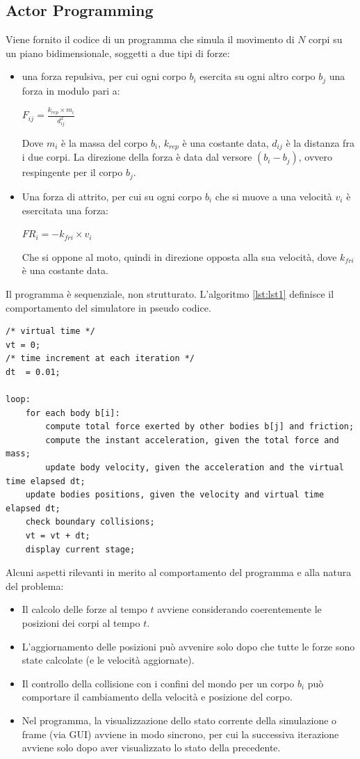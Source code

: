 \documentclass[12pt,a4paper,openright,twoside]{book}
\begin{document}
\subsection{Actor Programming}
Viene fornito il codice di un programma che simula il movimento di $N$ corpi su un piano bidimensionale,
soggetti a due tipi di forze:
\begin{itemize}
	\item una forza repulsiva, per cui ogni corpo $b_{i}$ esercita su ogni altro corpo $b_{j}$ una forza in modulo pari a:
	\begin{center}
		$ F_{ij} = \frac{k_{rep} \times m_{i}}{d^2_{ij}} $
	\end{center}
	Dove $m_{i}$ è la massa del corpo $b_{i}$, $k_{rep}$ è una costante data, $d_{ij}$ è la distanza fra i due corpi.
	La direzione della forza è data dal versore $(b_{i} - b_{j})$, ovvero respingente per il corpo $b_{j}$.
	\item Una forza di attrito, per cui su ogni corpo $b_{i}$ che si muove a una velocità $v_{i}$ è esercitata una forza:
	\begin{center}
		$ FR_{i} = - k_{fri} \times v_{i} $
	\end{center}
	Che si oppone al moto, quindi in direzione opposta alla sua velocità, dove $k_{fri}$ è una costante data.
\end{itemize}
Il programma è sequenziale, non strutturato. 
L'algoritmo \ref{lst:lst1} definisce il comportamento del simulatore in pseudo codice.
\newpage
\begin{lstlisting}[label=lst:lst1,caption=Pseudocodice del programma sequenziale]
/* virtual time */
vt = 0;
/* time increment at each iteration */     
dt  = 0.01;

loop:
	for each body b[i]:
		compute total force exerted by other bodies b[j] and friction;
		compute the instant acceleration, given the total force and mass;
		update body velocity, given the acceleration and the virtual time elapsed dt;
	update bodies positions, given the velocity and virtual time elapsed dt;
	check boundary collisions;
	vt = vt + dt;   
	display current stage;

\end{lstlisting}

Alcuni aspetti rilevanti in merito al comportamento del programma e alla natura del problema:
\begin{itemize}
	\item Il calcolo delle forze al tempo $t$ avviene considerando coerentemente le posizioni dei corpi al tempo $t$. 
	\item L'aggiornamento delle posizioni può avvenire solo dopo che tutte le forze sono state calcolate (e le velocità aggiornate).
	\item Il controllo della collisione con i confini del mondo per un corpo $b_{i}$ può comportare il cambiamento della velocità e posizione del corpo.
	\item Nel programma, la visualizzazione dello stato corrente della simulazione o frame (via GUI) avviene in modo sincrono, per cui la successiva iterazione avviene solo dopo aver visualizzato lo stato della precedente.
\end{itemize}
\end{document}
